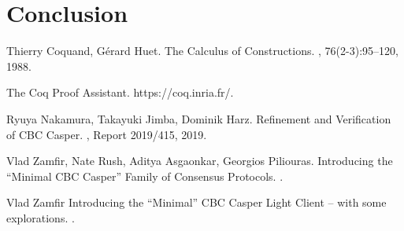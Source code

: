 \documentclass[runningheads]{llncs}
\begin{document}
\section{Conclusion}
\label{sec:conclusion}


\begin{thebibliography}{99}

 Thierry Coquand, Gérard Huet.
\newblock The Calculus of Constructions.
, 76(2-3):95--120, 1988.

\newblock The Coq Proof Assistant. 
\newblock https://coq.inria.fr/.

 Ryuya Nakamura, Takayuki Jimba, Dominik Harz.
\newblock Refinement and Verification of CBC Casper. 
, Report 2019/415, 2019.

 Vlad Zamfir, Nate Rush, Aditya Asgaonkar, Georgios Piliouras.
\newblock Introducing the ``Minimal CBC Casper'' Family of Consensus Protocols. 
. 

 Vlad Zamfir
\newblock Introducing the ``Minimal'' CBC Casper Light Client -- with some explorations. 
. 
\end{thebibliography}




\end{document}
